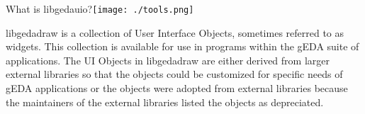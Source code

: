   What is libgedauio?\texttt{[image: ./tools.png]}

  libgedadraw is a collection of User Interface Objects, sometimes referred to as widgets.
  This collection is available for use in programs within the gEDA suite of applications.
  The UI Objects in libgedadraw are either derived from larger external libraries so
  that the objects could be customized for specific needs of gEDA applications or the
  objects were adopted from external libraries because the maintainers of the external
  libraries listed the objects as depreciated.

